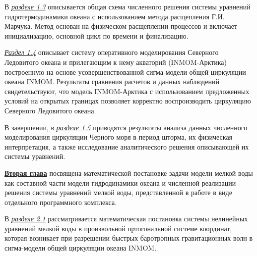 В \underline{\textit{разделе 1.3}} описывается общая схема численного решения системы уравнений гидротермодинамики океана с использованием метода расщепления Г.И. Марчука. Метод основан на физическом расщеплении процессов и включает инициализацию, основной цикл по времени и финализацию.

\underline{\textit{Раздел 1.4}} описывает систему оперативного моделирования Северного Ледовитого океана и прилегающим к нему акваторий (INMOM-Арктика) построенную на основе усовершенствованной сигма-модели общей циркуляции океана INMOM.
Результаты сравнения расчетов и данных наблюдений свидетельствуют, что модель INMOM-Арктика с использованием предложенных условий на открытых границах позволяет корректно воспроизводить циркуляцию Северного Ледовитого океана.

В завершении, в \underline{\textit{разделе 1.5}} приводятся результаты анализа данных численного моделирования циркуляции Черного моря в период шторма, их физическая интерпретация, а также исследование аналитического решения описывающей их системы уравнений.

\underline{\textbf{Вторая глава}} посвящена математической постановке задачи модели мелкой воды как составной части модели гидродинамики океана и численной реализации решения системы уравнений мелкой воды, представленной в работе в виде отдельного программного комплекса.

В \underline{\textit{разделе 2.1}} рассматривается математическая постановка системы нелинейных уравнений мелкой воды в произвольной ортогональной системе координат, которая возникает при разрешении быстрых баротропных гравитационных волн в сигма-модели общей циркуляции океана INMOM.

